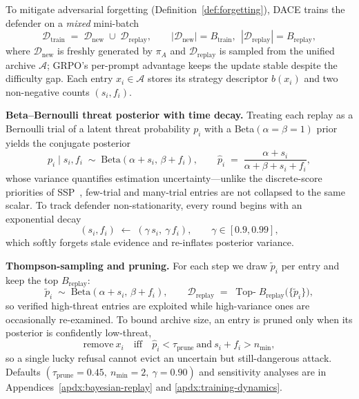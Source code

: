 \documentclass{article}
\newcommand{\method}{\textsc{DACE}\xspace}
\newcommand{\piA}{\pi_A}
\newcommand{\archive}{\mathcal{A}}
\begin{document}
To mitigate adversarial forgetting (Definition~\ref{def:forgetting}), \method trains the defender on a \emph{mixed} mini-batch
\begin{equation}
  \mathcal{D}_{\mathrm{train}} \;=\; \mathcal{D}_{\mathrm{new}} \;\cup\; \mathcal{D}_{\mathrm{replay}}, \qquad |\mathcal{D}_{\mathrm{new}}|=B_{\mathrm{train}},\ \ |\mathcal{D}_{\mathrm{replay}}|=B_{\mathrm{replay}},
  \label{eq:mixed-batch}
\end{equation}
where $\mathcal{D}_{\mathrm{new}}$ is freshly generated by $\piA$ and $\mathcal{D}_{\mathrm{replay}}$ is sampled from the unified archive $\archive$; GRPO's per-prompt advantage keeps the update stable despite the difficulty gap. Each entry $x_i \in \archive$ stores its strategy descriptor $b(x_i)$ and two non-negative counts $(s_i, f_i)$.

\textbf{Beta--Bernoulli threat posterior with time decay.}
Treating each replay as a Bernoulli trial of a latent threat probability $p_i$ with a Beta$(\alpha{=}\beta{=}1)$ prior yields the conjugate posterior
\begin{equation}
  p_i \mid s_i, f_i \;\sim\; \mathrm{Beta}(\alpha+s_i,\,\beta+f_i), \qquad
  \hat p_i \;=\; \frac{\alpha+s_i}{\alpha+\beta+s_i+f_i},
  \label{eq:posterior}
\end{equation}
whose variance quantifies estimation uncertainty---unlike the discrete-score priorities of SSP~\citep{ssp2026}, few-trial and many-trial entries are not collapsed to the same scalar. To track defender non-stationarity, every round begins with an exponential decay
\begin{equation}
  (s_i, f_i) \;\leftarrow\; (\gamma\, s_i,\ \gamma\, f_i), \qquad \gamma \in [0.9, 0.99],
  \label{eq:time-decay}
\end{equation}
which softly forgets stale evidence and re-inflates posterior variance.

\textbf{Thompson-sampling and pruning.}
For each step we draw $\tilde p_i$ per entry and keep the top $B_{\mathrm{replay}}$:
\begin{equation}
  \tilde p_i \;\sim\; \mathrm{Beta}(\alpha+s_i,\,\beta+f_i), \qquad
  \mathcal{D}_{\mathrm{replay}} \;=\; \operatorname{Top-}B_{\mathrm{replay}}\bigl(\{\tilde p_i\}\bigr),
  \label{eq:thompson}
\end{equation}
so verified high-threat entries are exploited while high-variance ones are occasionally re-examined. To bound archive size, an entry is pruned only when its posterior is confidently low-threat,
\begin{equation}
  \text{remove}\ x_i \quad \text{iff} \quad \hat p_i < \tau_{\mathrm{prune}} \ \text{and}\ s_i + f_i > n_{\min},
  \label{eq:pruning}
\end{equation}
so a single lucky refusal cannot evict an uncertain but still-dangerous attack. Defaults $(\tau_{\mathrm{prune}}{=}0.45,\ n_{\min}{=}2,\ \gamma{=}0.90)$ and sensitivity analyses are in Appendices~\ref{apdx:bayesian-replay} and \ref{apdx:training-dynamics}.
\end{document}
